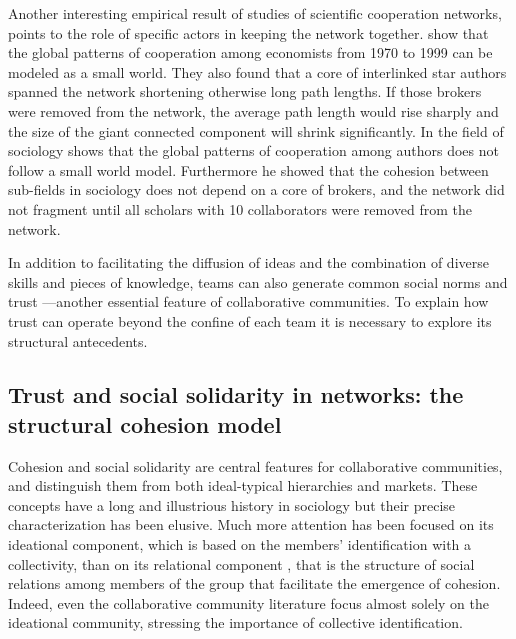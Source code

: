 Another interesting empirical result of studies of scientific cooperation networks, points to the role of specific actors in keeping the network together. \citet*{goyal:2006} show that the global patterns of cooperation among economists from 1970 to 1999 can be modeled as a small world. They also found that a core of interlinked star authors spanned the network shortening otherwise long path lengths. If those brokers were removed from the network, the average path length would rise sharply and the size of the giant connected component will shrink significantly. In the field of sociology \citet{moody:2004} shows that the global patterns of cooperation among authors does not follow a small world model. Furthermore he showed that the cohesion between sub-fields in sociology does not depend on a core of brokers, and the network did not fragment until all scholars with 10 collaborators were removed from the network.

In addition to facilitating the diffusion of ideas and the combination of diverse skills and pieces of knowledge, teams can also generate common social norms and trust ---another essential feature of collaborative communities.  To explain how trust can operate beyond the confine of each team it is necessary to explore its structural antecedents.

\subsection{Trust and social solidarity in networks: the structural cohesion model}
\label{scm}

Cohesion and social solidarity are central features for collaborative communities, and distinguish them from both ideal-typical hierarchies and markets. These concepts have a long and illustrious history in sociology \citep{durkheim:2008} but their precise characterization has been elusive. Much more attention has been focused on its ideational component, which is based on the members' identification with a collectivity, than on its relational component \citep{doreian:1998}, that is the structure of social relations among members of the group that facilitate the emergence of cohesion. Indeed, even the collaborative community literature focus almost solely on the ideational community, stressing the importance of collective identification.

